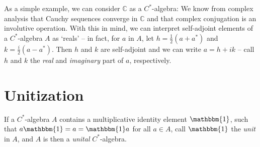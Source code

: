 \documentclass[11pt,a4paper]{report}
\theoremstyle{plain}
\theoremstyle{definition}
\newcommand{\1}{\mathbbm{1}}
\newcommand{\C}{\mathbb{C}}
\begin{document}
As a simple example, we can consider $\C$ as a $C^\ast$-algebra: We know from 
complex analysis that Cauchy sequences converge in $\C$ and that complex 
conjugation is an involutive operation. With this in mind, we can interpret 
self-adjoint elements of a $C^\ast$-algebra $A$ as `reals' -- in fact, for $a$ 
in $A$, let $h=\tfrac{1}{2}(a+a^\ast)$ and $k=\tfrac{i}{2}(a-a^\ast)$. Then $h$ 
and $k$ are self-adjoint and we can write $a=h+ik$ -- call $h$ and $k$ the 
\emph{real} and \emph{imaginary} part of $a$, respectively. 

\section{Unitization}
If a $C^\ast$-algebra $A$ contains a multiplicative identity element $\1$, such 
that $a \1 = a = \1  a$ for all $a \in A$, call $\1$ the \emph{unit} in $A$, and 
$A$ is then a \emph{unital} $C^\ast$-algebra.
\end{document}
